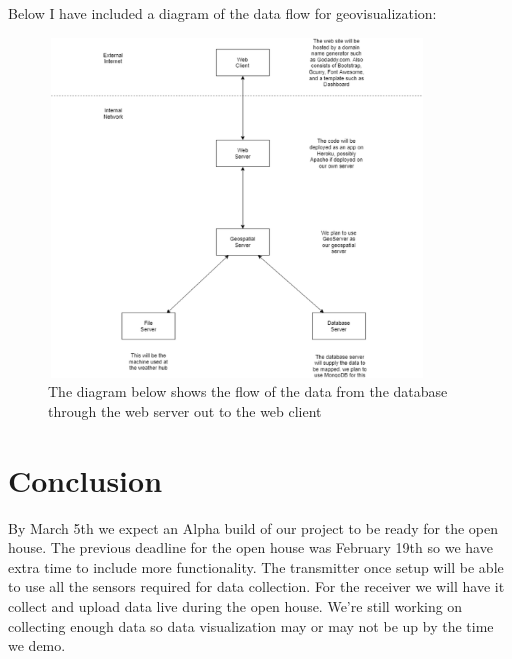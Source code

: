 \documentclass[onecolumn, draftclsnofoot,10pt, compsoc]{IEEEtran}
\begin{document}
 Below I have included a diagram of the data flow for geovisualization:
\begin{figure}[ht]
\caption{The diagram below shows the flow of the data from the database through the web server out to the web client}
\centering
\includegraphics[width=10cm, height=9cm]{geoviz_flow.eps}
\end{figure}

\section{Conclusion}
	By March 5th we expect an Alpha build of our project to be ready for the open house.  The previous deadline for the open house was February 19th so we have extra time to include more functionality.  The transmitter once setup will be able to use all the sensors required for data collection.  For the receiver we will have it collect and upload data live during the open house.  We’re still working on collecting enough data so data visualization may or may not be up by the time we demo.
\end{document}
